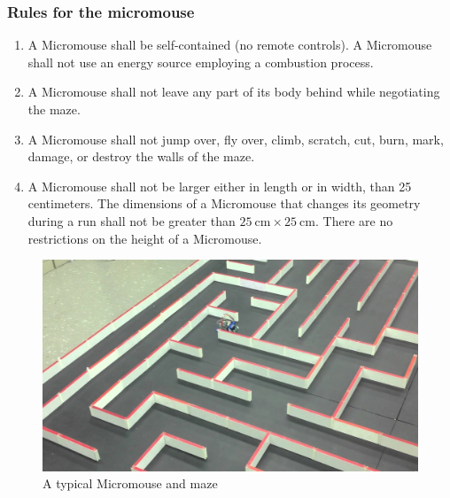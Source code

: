 \documentclass[10pt,twocolumn,letterpaper]{article}
\begin{document}
\subsubsection{Rules for the micromouse}
\label{ssub:mouserules}
\begin{enumerate}
	\item A Micromouse shall be self-contained (no remote controls). A Micromouse shall not use an energy source
	employing a combustion process.
	\item A Micromouse shall not leave any part of its body behind while negotiating the maze.
	\item A Micromouse shall not jump over, fly over, climb, scratch, cut, burn, mark, damage, or destroy
	the walls of the maze.
	\item A Micromouse shall not be larger either in length or in width, than 25 centimeters. The dimensions of a
	Micromouse that changes its geometry during a run shall not be greater than $25\ \textrm{cm} \times 25\
	\textrm{cm}$. There are no restrictions on the height of a Micromouse.
\end{enumerate}

\begin{figure}[b]
\begin{center}
	\includegraphics[width=0.8\linewidth]{maze_and_mouse.jpg}
\end{center}
\caption{A typical Micromouse and maze}
\label{fig:mouse_and_maze}
\end{figure}
\end{document}
